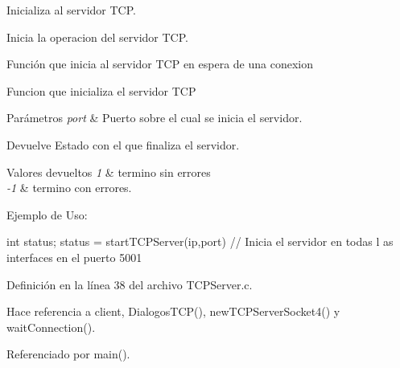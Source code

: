 Inicializa al servidor TCP. 

Inicia la operacion del servidor TCP.

Función que inicia al servidor TCP en espera de una conexion

Funcion que inicializa el servidor TCP


\begin{DoxyParams}{Parámetros}
{\em port} & Puerto sobre el cual se inicia el servidor.\\
\hline
\end{DoxyParams}
\begin{DoxyReturn}{Devuelve}
Estado con el que finaliza el servidor. 
\end{DoxyReturn}

\begin{DoxyRetVals}{Valores devueltos}
{\em 1} & termino sin errores \\
\hline
{\em -\/1} & termino con errores.\\
\hline
\end{DoxyRetVals}
Ejemplo de Uso: 
\begin{DoxyCode}
                int status;
                status = startTCPServer(ip,port) // Inicia el servidor en todas l
      as interfaces en el puerto 5001 
\end{DoxyCode}
 

Definición en la línea 38 del archivo TCPServer.c.



Hace referencia a client, DialogosTCP(), newTCPServerSocket4() y waitConnection().



Referenciado por main().


